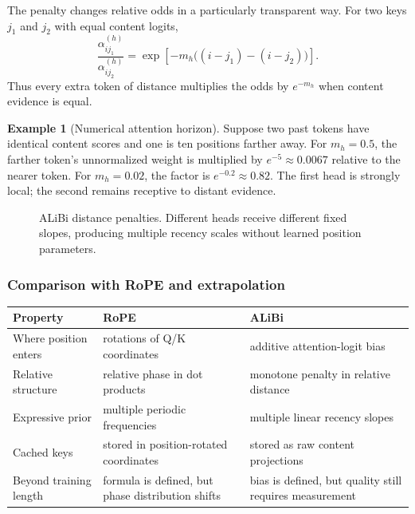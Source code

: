 \documentclass[11pt,a4paper]{article}
\theoremstyle{definition}
\newtheorem{example}{Example}[section]
\theoremstyle{plain}
\begin{document}
The penalty changes relative odds in a particularly transparent way. For two keys $j_1$ and $j_2$ with equal content logits,
\begin{equation}
    \frac{\alpha_{ij_1}^{(h)}}{\alpha_{ij_2}^{(h)}}
    =\exp\!\left[-m_h\bigl((i-j_1)-(i-j_2)\bigr)\right].
\end{equation}
Thus every extra token of distance multiplies the odds by $e^{-m_h}$ when content evidence is equal.

\begin{example}[Numerical attention horizon]
Suppose two past tokens have identical content scores and one is ten positions farther away. For $m_h=0.5$, the farther token's unnormalized weight is multiplied by $e^{-5}\approx0.0067$ relative to the nearer token. For $m_h=0.02$, the factor is $e^{-0.2}\approx0.82$. The first head is strongly local; the second remains receptive to distant evidence.
\end{example}

\begin{figure}[H]
\centering
{}
\caption{ALiBi distance penalties. Different heads receive different fixed slopes, producing multiple recency scales without learned position parameters.}
\label{fig:alibi-slopes}
\end{figure}

\subsubsection{Comparison with RoPE and extrapolation}

\begin{center}
\begin{tabular}{p{3.2cm}p{5.0cm}p{5.0cm}}
\toprule
Property & RoPE & ALiBi\\
\midrule
Where position enters & rotations of Q/K coordinates & additive attention-logit bias\\
Relative structure & relative phase in dot products & monotone penalty in relative distance\\
Expressive prior & multiple periodic frequencies & multiple linear recency slopes\\
Cached keys & stored in position-rotated coordinates & stored as raw content projections\\
Beyond training length & formula is defined, but phase distribution shifts & bias is defined, but quality still requires measurement\\
\bottomrule
\end{tabular}
\end{center}
\end{document}
